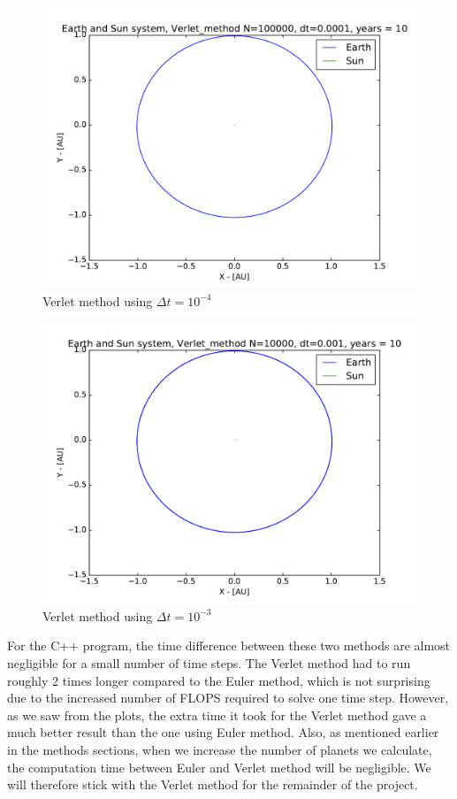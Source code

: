 \documentclass[12pt]{article}
\begin{document}
\begin{figure}[!h]
\centering
\includegraphics[width=\linewidth]{Plots/Earth_Sun_Verlet_method.pdf}
\caption{Verlet method using $\Delta t = 10^{-4}$}
\label{fig:balle2}
\end{figure}
\begin{figure}[!h]
\centering
\includegraphics[width=\linewidth]{Plots/Earth_Sun_Verlet_method_larger_dt.pdf}
\caption{Verlet method using $\Delta t = 10^{-3}$}
\label{fig:balle3}
\end{figure}

For the C++ program, the time difference between these two methods are almost negligible for a small number of time steps. The Verlet method had to run roughly 2 times longer compared to the Euler method, which is not surprising due to the increased number of FLOPS required to solve one time step. However, as we saw from the plots, the extra time it took for the Verlet method gave a much better result than the one using Euler method. Also, as mentioned earlier in the methods sections, when we increase the number of planets we calculate, the computation time between Euler and Verlet method will be negligible. We will therefore stick with the Verlet method for the remainder of the project. 
\end{document}
